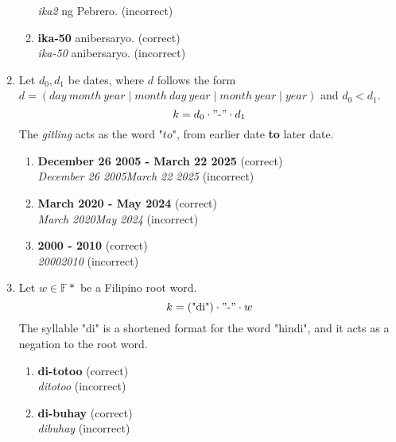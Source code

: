 \begin{enumerate}
\begin{enumerate}
                        \textit{ika2} ng Pebrero. (incorrect)
                  \item \textbf{ika-50} anibersaryo. (correct) \\
                        \textit{ika-50} anibersaryo. (incorrect)
            \end{enumerate}
      \item
            Let \(d_0, d_1\) be dates, where \(d\) follows the form \(d = (day \ month \ year \mid month \ day \ year \mid month \ year \mid year)\) and \(d_0 < d_1\).
            \[
            k = d_0 \cdot "\text{-}" \cdot d_1
            \]
            The \textit{gitling} acts as the word "$to$", from earlier date \textbf{to} later date.
                        \begin{example}
            \end{example}
            \begin{enumerate}
                  \item \textbf{December 26 2005 - March 22 2025} (correct) \\
                        \textit{December 26 2005March 22 2025} (incorrect)
                  \item \textbf{March 2020 - May 2024} (correct) \\
                        \textit{March 2020May 2024} (incorrect)
                  \item \textbf{2000 - 2010} (correct) \\
                        \textit{20002010} (incorrect)
            \end{enumerate}

    \item 
            Let \(w \in \mathbb{F}*\) be a Filipino root word.
            \[
            k = (\text{"di"}) \cdot "\text{-}" \cdot w
            \]
            The syllable "di" is a shortened format for the word "hindi", and it acts as a negation to the root word.
            \begin{example}
            \end{example}
            \begin{enumerate}
                  \item \textbf{di-totoo} (correct) \\
                        \textit{ditotoo} (incorrect)
                  \item \textbf{di-buhay} (correct) \\
                        \textit{dibuhay} (incorrect)
            \end{enumerate}
      
\end{enumerate}